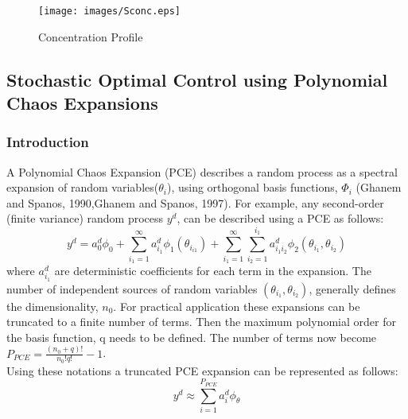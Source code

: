 \documentclass[3p,times]{elsarticle}
\begin{document}
\begin{figure}[h!] 

\begin{center}
\texttt{[image: images/Sconc.eps]}
\end{center}
\caption{Concentration Profile}
\end{figure}


\subsection{Stochastic Optimal Control using Polynomial Chaos Expansions}
\subsubsection{Introduction}
A Polynomial Chaos Expansion (PCE) describes a random process as a spectral expansion of random variables($\theta_{i}$), using orthogonal basis functions, $\Phi_{i}$ (Ghanem and Spanos, 1990,Ghanem and Spanos, 1997). For example, any second-order (finite variance) random process $y^{d}$, can be described using a PCE as follows:
\begin{equation}
y^{d} = a_{0}^{d}\phi_{0} + \sum_{i_{1}=1}^{\infty} a_{i_{1}}^{d}\phi_{1}(\theta_{i_{i1}}) + \sum_{i_{1}=1}^{\infty}\sum_{i_{2}=1}^{i_{1}} a_{i_{1}i_{2}}^d\phi_{2}(\theta_{i_{1}},\theta_{i_{2}})
\end{equation}
where $a_{i_{1}}^d$  are deterministic coefficients for each term in the expansion. The number of independent sources of random variables $(\theta_{i_{1}}, \theta_{i_{2}})$, generally defines the dimensionality, $n_{0}$. For practical application these expansions can be
truncated to a finite number of terms. Then the maximum polynomial order for the basis function, q needs to be defined.
The number of terms now become $P_{PCE} = \frac{(n_{0}+q)!}{n_{0}!q!} -1 $. \\
Using these notations a truncated PCE expansion can be represented as follows:
\begin{equation} 
\label{poly}
y^{d} \approx \sum_{i=1}^{P_{PCE}} a_{i}^{d}\phi_{\theta}
\end{equation}
\end{document}
